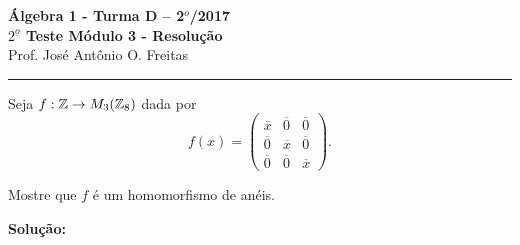 \documentclass[12pt]{article}
\begin{document}


\begin{center}
{\Large\bf {\'A}lgebra 1 - Turma D -- 2$^{o}$/2017} \\ \vspace{9pt} {\large\bf
  $2^{\underline{o}}$ Teste Módulo 3 - Resolu\c{c}\~ao}\\
\vspace{9pt} Prof. Jos{\'e} Ant{\^o}nio O. Freitas
\end{center}
\hrule

\vspace{.6cm}

Seja $f : \mathbb{Z} \to M_3(\mathbb{Z}_8)$ dada por
\[
	f(x) = \begin{pmatrix}
		\overline{x} & \overline{0} & \overline{0}\\
		\overline{0} & \overline{x} & \overline{0}\\
		\overline{0} & \overline{0} & \overline{x}
	\end{pmatrix}.
\]

\questao Mostre que $f$ é um homomorfismo de anéis.

\noindent\textbf{Solu\c{c}\~ao:}
\end{document}

